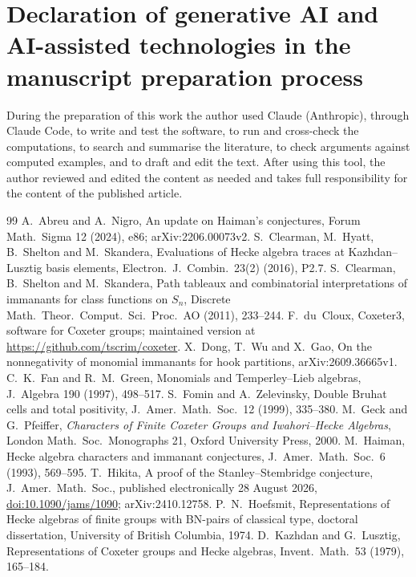 \documentclass[11pt]{amsart}
\theoremstyle{definition}
\theoremstyle{remark}
\begin{document}
\section*{Declaration of generative AI and AI-assisted technologies in the manuscript preparation process}
During the preparation of this work the author used Claude (Anthropic), through Claude Code, to write and test the software, to run and cross-check the computations, to search and summarise the literature, to check arguments against computed examples, and to draft and edit the text. After using this tool, the author reviewed and edited the content as needed and takes full responsibility for the content of the published article.

\begin{thebibliography}{99}
 A.~Abreu and A.~Nigro, An update on Haiman's conjectures, Forum Math.\ Sigma 12 (2024), e86; arXiv:2206.00073v2.
 S.~Clearman, M.~Hyatt, B.~Shelton and M.~Skandera, Evaluations of Hecke algebra traces at Kazhdan--Lusztig basis elements, Electron.\ J.\ Combin.\ 23(2) (2016), P2.7.
 S.~Clearman, B.~Shelton and M.~Skandera, Path tableaux and combinatorial interpretations of immanants for class functions on $S_n$, Discrete Math.\ Theor.\ Comput.\ Sci.\ Proc.\ AO (2011), 233--244.
 F.~du~Cloux, \textsf{Coxeter3}, software for Coxeter groups; maintained version at \url{https://github.com/tscrim/coxeter}.
 X.~Dong, T.~Wu and X.~Gao, On the nonnegativity of monomial immanants for hook partitions, arXiv:2609.36665v1.
 C.~K.~Fan and R.~M.~Green, Monomials and Temperley--Lieb algebras, J.\ Algebra 190 (1997), 498--517.
 S.~Fomin and A.~Zelevinsky, Double Bruhat cells and total positivity, J.\ Amer.\ Math.\ Soc.\ 12 (1999), 335--380.
 M.~Geck and G.~Pfeiffer, \emph{Characters of Finite Coxeter Groups and Iwahori--Hecke Algebras}, London Math.\ Soc.\ Monographs 21, Oxford University Press, 2000.
 M.~Haiman, Hecke algebra characters and immanant conjectures, J.\ Amer.\ Math.\ Soc.\ 6 (1993), 569--595.
 T.~Hikita, A proof of the Stanley--Stembridge conjecture, J.\ Amer.\ Math.\ Soc., published electronically 28 August 2026, \href{https://doi.org/10.1090/jams/1090}{doi:10.1090/jams/1090}; arXiv:2410.12758.
 P.~N.~Hoefsmit, Representations of Hecke algebras of finite groups with BN-pairs of classical type, doctoral dissertation, University of British Columbia, 1974.
 D.~Kazhdan and G.~Lusztig, Representations of Coxeter groups and Hecke algebras, Invent.\ Math.\ 53 (1979), 165--184.

\end{thebibliography}
\end{document}
